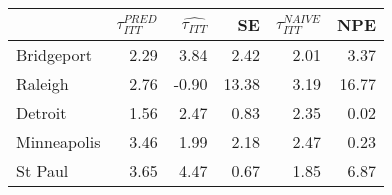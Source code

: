 
\begin{tabular}{lrrrrr}
\toprule
  & $\tau_{ITT}^{PRED}$ & $\hat{\tau_{ITT}}$ & SE & $\tau_{ITT}^{NAIVE}$ & NPE\\
\midrule
Bridgeport & 2.29 & 3.84 & 2.42 & 2.01 & 3.37\\
Raleigh & 2.76 & -0.90 & 13.38 & 3.19 & 16.77\\
Detroit & 1.56 & 2.47 & 0.83 & 2.35 & 0.02\\
Minneapolis & 3.46 & 1.99 & 2.18 & 2.47 & 0.23\\
St Paul & 3.65 & 4.47 & 0.67 & 1.85 & 6.87\\
\bottomrule
\end{tabular}